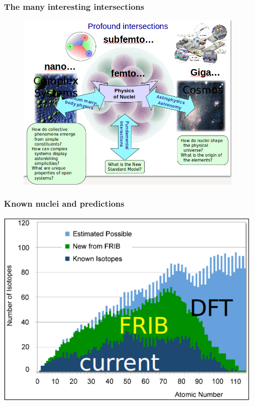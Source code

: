 \documentclass[compress]{beamer}
\begin{document}
\frame
{
  \frametitle{The many interesting intersections}
      \begin{figure}[htp]
        \centering	
        	\includegraphics[width=1.0\textwidth]{Figures/crossfield.png}
      \end{figure}
}



\frame
    {
      \frametitle{Known nuclei and predictions}
      \begin{center}
	\includegraphics[width=1.0\textwidth]{Figures/current.png}
      \end{center}
    }
\end{document}
